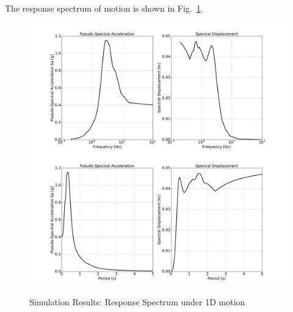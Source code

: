 The response spectrum of motion is shown in Fig.~\ref{fig_spectrum_freq_period_time_series_ssi3d_1D_motion}.
\begin{figure}[H]
  \centering
  \includegraphics[width = 15cm]{./Figure-files/nonlinear_analysis_steps/soil-structure-1D-ans/shell_structure_motion_node_3195_x_spectrum_freq.pdf}
  \includegraphics[width = 15cm]{./Figure-files/nonlinear_analysis_steps/soil-structure-1D-ans/shell_structure_motion_node_3195_x_spectrum_period.pdf}
  \caption{Simulation Results: Response Spectrum under 1D motion}
  \label{fig_spectrum_freq_period_time_series_ssi3d_1D_motion}
\end{figure}


